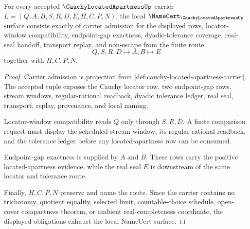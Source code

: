 \begin{theorem}
\label{thm:cauchy-located-apartness-namecert-obligations}
For every accepted $\CauchyLocatedApartnessUp$ carrier $L=(Q,A,B,S,R,D,E,H,C,P,N)$, the local $\NameCert_{\CauchyLocatedApartnessUp}$ surface consists exactly of carrier admission for the displayed rows, locator-window compatibility, endpoint-gap exactness, dyadic-tolerance coverage, real-seal handoff, transport replay, and non-escape from the finite route
$$
Q,S,R,D\longmapsto A,B\longmapsto E
$$
together with $H,C,P,N$.
\end{theorem}
\begin{proof}
Carrier admission is projection from \autoref{def:cauchy-located-apartness-carrier}. The accepted tuple exposes the Cauchy locator row, two endpoint-gap rows, stream windows, regular-rational readback, dyadic tolerance ledger, real seal, transport, replay, provenance, and local naming.

Locator-window compatibility reads $Q$ only through $S,R,D$. A finite comparison request must display the scheduled stream window, its regular rational readback, and the tolerance ledger before any located-apartness row can be consumed.

Endpoint-gap exactness is supplied by $A$ and $B$. These rows carry the positive located-apartness evidence, while the real seal $E$ is downstream of the same locator and tolerance route.

Finally, $H,C,P,N$ preserve and name the route. Since the carrier contains no trichotomy, quotient equality, selected limit, countable-choice schedule, open-cover compactness theorem, or ambient real-completeness coordinate, the displayed obligations exhaust the local NameCert surface.
\end{proof}

